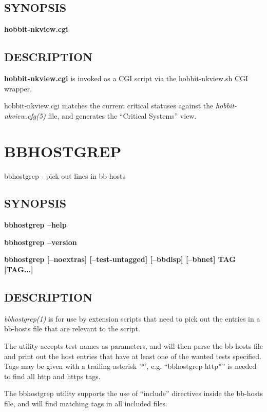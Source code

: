 \subsection{SYNOPSIS}
\textbf{hobbit-nkview.cgi}


 
\subsection{DESCRIPTION}
\textbf{hobbit-nkview.cgi} is invoked as a CGI script via the hobbit-nkview.sh CGI wrapper. 

  hobbit-nkview.cgi matches the current critical statuses against the
  \emph{hobbit-nkview.cfg(5)} file, and generates the ``Critical
  Systems'' view. 


%
\newpage
\section{BBHOSTGREP}

 bbhostgrep - pick out lines in bb-hosts

 \subsection{SYNOPSIS}
\textbf{bbhostgrep --help}
 
\textbf{bbhostgrep --version}
 
\textbf{bbhostgrep [--noextras] [--test-untagged] [--bbdisp] [--bbnet] TAG [TAG...]}


 
\subsection{DESCRIPTION}
\emph{bbhostgrep(1)}
 is for use by extension scripts that need to pick out the entries in
 a bb-hosts file that are relevant to the script. 


  The utility accepts test names as parameters, and will then parse
  the bb-hosts file and print out the host entries that have at least
  one of the wanted tests specified. Tags may be given with a trailing
  asterisk '*', e.g. ``bbhostgrep http*'' is needed to find all http
  and https tags. 



  The bbhostgrep utility supports the use of ``include'' directives
  inside the bb-hosts file, and will find matching tags in all
  included files. 



